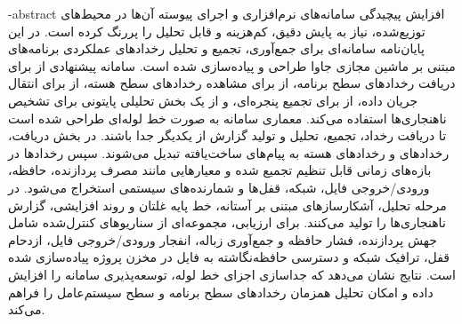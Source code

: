 
\fa-abstract{
افزایش پیچیدگی سامانه‌های نرم‌افزاری و اجرای پیوسته آن‌ها در محیط‌های توزیع‌شده، نیاز به پایش دقیق، کم‌هزینه و قابل تحلیل را پررنگ کرده است. در این پایان‌نامه سامانه‌ای برای جمع‌آوری، تجمیع و تحلیل رخدادهای عملکردی برنامه‌های مبتنی بر ماشین مجازی جاوا طراحی و پیاده‌سازی شده است. سامانه پیشنهادی از  برای دریافت رخدادهای سطح برنامه، از  برای مشاهده رخدادهای سطح هسته، از  برای انتقال جریان داده، از  برای تجمیع پنجره‌ای، و از یک بخش تحلیلی پایتونی برای تشخیص ناهنجاری‌ها استفاده می‌کند. معماری سامانه به صورت خط لوله‌ای طراحی شده است تا دریافت رخداد، تجمیع، تحلیل و تولید گزارش از یکدیگر جدا باشند. در بخش دریافت، رخدادهای  و رخدادهای هسته به پیام‌های ساخت‌یافته تبدیل می‌شوند. سپس رخدادها در بازه‌های زمانی قابل تنظیم تجمیع شده و معیارهایی مانند مصرف پردازنده، حافظه، ورودی/خروجی فایل، شبکه، قفل‌ها و شمارنده‌های سیستمی استخراج می‌شود. در مرحله تحلیل، آشکارسازهای مبتنی بر آستانه، خط پایه غلتان و روند افزایشی، گزارش ناهنجاری‌ها را تولید می‌کنند. برای ارزیابی، مجموعه‌ای از سناریوهای کنترل‌شده شامل جهش پردازنده، فشار حافظه و جمع‌آوری زباله، انفجار ورودی/خروجی فایل، ازدحام قفل، ترافیک شبکه و دسترسی حافظه‌نگاشته به فایل در مخزن پروژه پیاده‌سازی شده است. نتایج نشان می‌دهد که جداسازی اجزای خط لوله، توسعه‌پذیری سامانه را افزایش داده و امکان تحلیل همزمان رخدادهای سطح برنامه و سطح سیستم‌عامل را فراهم می‌کند.
}


